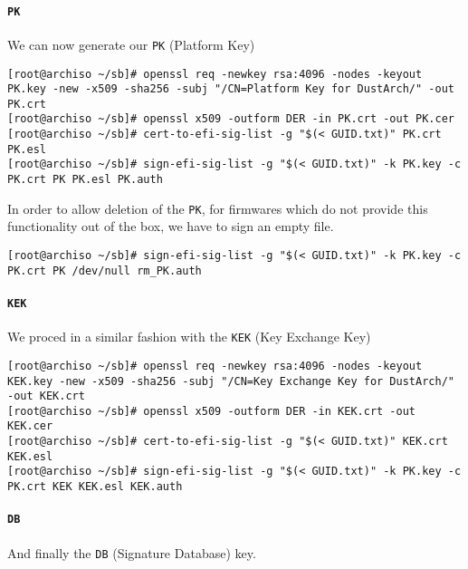\documentclass[9pt]{report}
\begin{document}
\newpage

\hypertarget{x-pk}{\paragraph{\texttt{PK}}}
We can now generate our \texttt{PK} (Platform Key)


\begin{verbatim}
[root@archiso ~/sb]# openssl req -newkey rsa:4096 -nodes -keyout PK.key -new -x509 -sha256 -subj "/CN=Platform Key for DustArch/" -out PK.crt
[root@archiso ~/sb]# openssl x509 -outform DER -in PK.crt -out PK.cer
[root@archiso ~/sb]# cert-to-efi-sig-list -g "$(< GUID.txt)" PK.crt PK.esl
[root@archiso ~/sb]# sign-efi-sig-list -g "$(< GUID.txt)" -k PK.key -c PK.crt PK PK.esl PK.auth
\end{verbatim}

In order to allow deletion of the \texttt{PK}, for firmwares which do not provide this functionality out of the box, we have to sign an empty file.


\begin{verbatim}
[root@archiso ~/sb]# sign-efi-sig-list -g "$(< GUID.txt)" -k PK.key -c PK.crt PK /dev/null rm_PK.auth
\end{verbatim}


\newpage

\hypertarget{x-kek}{\paragraph{\texttt{KEK}}}
We proced in a similar fashion with the \texttt{KEK} (Key Exchange Key)


\begin{verbatim}
[root@archiso ~/sb]# openssl req -newkey rsa:4096 -nodes -keyout KEK.key -new -x509 -sha256 -subj "/CN=Key Exchange Key for DustArch/" -out KEK.crt
[root@archiso ~/sb]# openssl x509 -outform DER -in KEK.crt -out KEK.cer
[root@archiso ~/sb]# cert-to-efi-sig-list -g "$(< GUID.txt)" KEK.crt KEK.esl
[root@archiso ~/sb]# sign-efi-sig-list -g "$(< GUID.txt)" -k PK.key -c PK.crt KEK KEK.esl KEK.auth
\end{verbatim}


\newpage

\hypertarget{x-db}{\paragraph{\texttt{DB}}}
And finally the \texttt{DB} (Signature Database) key.
\end{document}
